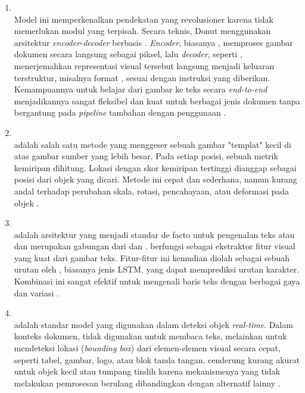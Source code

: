 \begin{enumerate}
    \item \donut{} ~\\ Model ini memperkenalkan pendekatan yang revolusioner karena tidak memerlukan modul \ocr{} yang terpisah. Secara teknis, Donut menggunakan arsitektur \textit{encoder-decoder} berbasis \transformer. \textit{Encoder}, biasanya \swin, memproses gambar dokumen secara langsung sebagai piksel, lalu \textit{decoder}, seperti \bart, menerjemahkan representasi visual tersebut langsung menjadi keluaran terstruktur, misalnya format \json, sesuai dengan instruksi yang diberikan. Kemampuannya untuk belajar dari gambar ke teks secara \textit{end-to-end} menjadikannya sangat fleksibel dan kuat untuk berbagai jenis dokumen tanpa bergantung pada \emph{pipeline} tambahan dengan penggunaan \ocr{} \parencite{kim2021donut}.

    \item \templatematching{} ~\\ \templatematching{} adalah salah satu metode \cv yang menggeser sebuah gambar "templat" kecil di atas gambar sumber yang lebih besar. Pada setiap posisi, sebuah metrik kemiripan dihitung. Lokasi dengan skor kemiripan tertinggi dianggap sebagai posisi dari objek yang dicari. Metode ini cepat dan sederhana, namun kurang andal terhadap perubahan skala, rotasi, pencahayaan, atau deformasi pada objek \parencite{bradski2008learning}.

    \item \crnn ~\\ 
    \crnn{} adalah arsitektur \dl{} yang menjadi standar de facto untuk pengenalan teks atau \ocr{} dan merupakan gabungan dari \cnn{} dan \rnn. \cnn{} berfungsi sebagai ekstraktor fitur visual yang kuat dari gambar teks. Fitur-fitur ini kemudian diolah sebagai sebuah urutan oleh \rnn, biasanya jenis LSTM, yang dapat memprediksi urutan karakter. Kombinasi ini sangat efektif untuk mengenali baris teks dengan berbagai gaya dan variasi \parencite{shi2016end}.

    \item \yolo ~\\ \yolo{} adalah standar model yang digunakan dalam deteksi objek \textit{real-time}. Dalam konteks dokumen, \yolo{} tidak digunakan untuk membaca teks, melainkan untuk mendeteksi lokasi (\emph{bounding box}) dari elemen-elemen visual secara cepat, seperti tabel, gambar, logo, atau blok tanda tangan. \yolo{} cenderung kurang akurat untuk objek kecil atau tumpang tindih karena mekanismenya yang tidak melakukan pemrosesan berulang dibandingkan dengan alternatif lainny \parencite{diwan2023object}. 
    

\end{enumerate}
